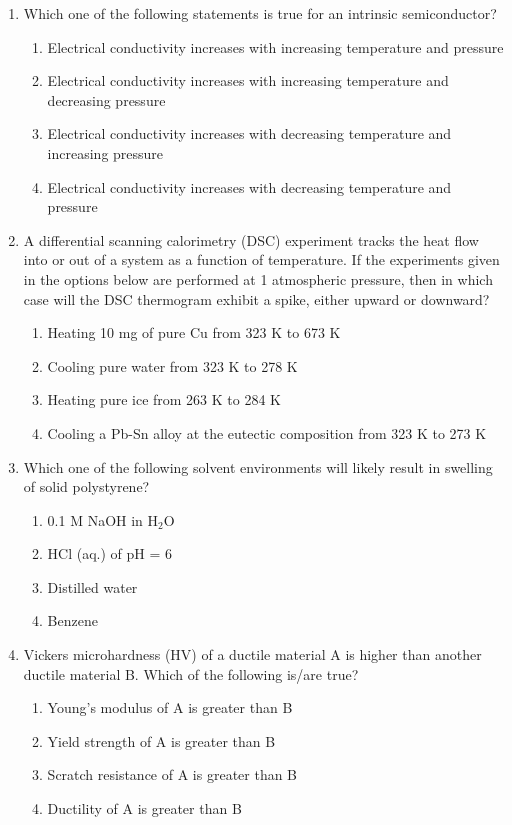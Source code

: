 \documentclass[journal,12pt,onecolumn]{IEEEtran}
\theoremstyle{remark}
\begin{document}
\begin{enumerate}
\item Which one of the following statements is true for an intrinsic semiconductor?
\begin{enumerate}
	\item Electrical conductivity increases with increasing temperature and pressure
	\item Electrical conductivity increases with increasing temperature and decreasing pressure
	\item Electrical conductivity increases with decreasing temperature and increasing pressure
	\item Electrical conductivity increases with decreasing temperature and pressure
\end{enumerate}

\item A differential scanning calorimetry (DSC) experiment tracks the heat flow into or out of a system as a function of temperature. If the experiments given in the options below are performed at 1 atmospheric pressure, then in which case will the DSC thermogram exhibit a spike, either upward or downward?
\begin{enumerate}
	\item Heating 10 mg of pure Cu from 323 K to 673 K
	\item Cooling pure water from 323 K to 278 K
	\item Heating pure ice from 263 K to 284 K
	\item Cooling a Pb-Sn alloy at the eutectic composition from 323 K to 273 K
\end{enumerate}

\item Which one of the following solvent environments will likely result in swelling of solid polystyrene?
\begin{enumerate}
	\item 0.1 M NaOH in H$_2$O
	\item HCl (aq.) of pH = 6
	\item Distilled water
	\item Benzene
\end{enumerate}

\item Vickers microhardness (HV) of a ductile material A is higher than another ductile material B. Which of the following is/are true?
\begin{enumerate}
	\item Young's modulus of A is greater than B
	\item Yield strength of A is greater than B
	\item Scratch resistance of A is greater than B
	\item Ductility of A is greater than B
\end{enumerate}


\end{enumerate}
\end{document}
